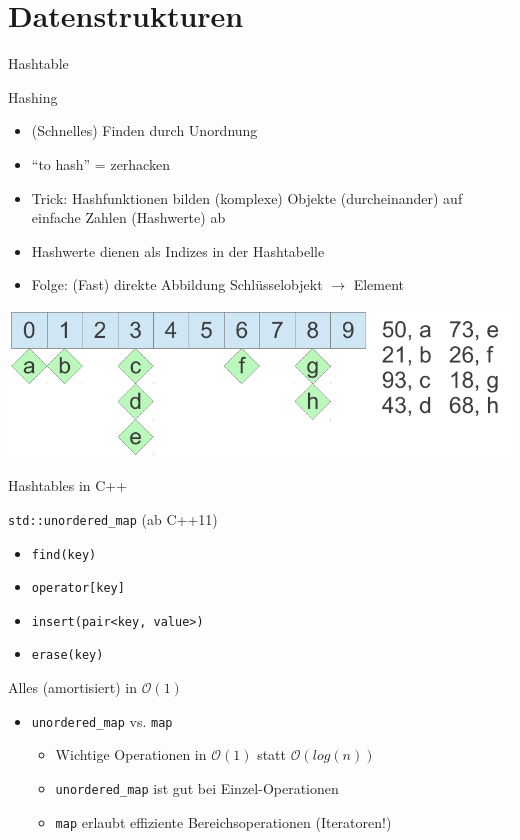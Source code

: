 \section{Datenstrukturen}

\begin{frame}{Hashtable}
 	\begin{block}{Hashing}
	 	\begin{itemize}
	 		\item (Schnelles) Finden durch Unordnung
	 		\item \enquote{to hash} = zerhacken
			\pause
	 		\item Trick: Hashfunktionen bilden (komplexe) Objekte (durcheinander) auf einfache Zahlen (Hashwerte) ab
	 		\item Hashwerte dienen als Indizes in der Hashtabelle
	 		\item Folge: (Fast) direkte Abbildung Schlüsselobjekt $\rightarrow$ Element
	 	\end{itemize}
 	\end{block}
 	
 	\pause
 	
 	\begin{center}
		\includegraphics[width=0.95\linewidth]{images/hashmap.pdf}
	\end{center}
\end{frame}

\begin{frame}{Hashtables in C++}
 	\begin{block}{\texttt{std::unordered\_map} (ab C++11)}
	 	\begin{itemize}
	 		\item \texttt{find(key)}
	 		\item \texttt{operator[key]}
	 		\item \texttt{insert(pair<key, value>)}
	 		\item \texttt{erase(key)}
	 	\end{itemize}
	 	\pause
	 	Alles (amortisiert) in $\mathcal{O}(1)$
 	\end{block}
 	
 	\begin{itemize}
 		\item \texttt{unordered\_map} vs. \texttt{map}
 		\begin{itemize}
 			\item Wichtige Operationen in $\mathcal{O}(1)$ statt $\mathcal{O}(log(n))$
 			\item \texttt{unordered\_map} ist gut bei Einzel-Operationen
 			\item \texttt{map} erlaubt effiziente Bereichsoperationen (Iteratoren!)
 		\end{itemize}
 	\end{itemize}
\end{frame}

